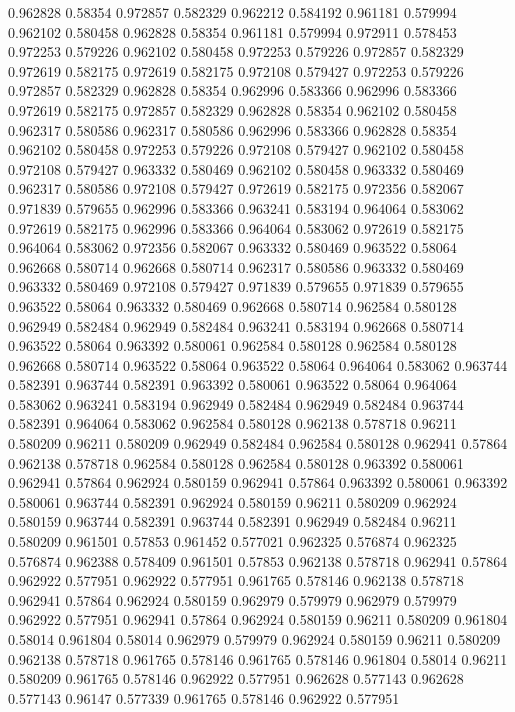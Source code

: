 0.962828 0.58354
0.972857 0.582329
0.962212 0.584192
0.961181 0.579994
0.962102 0.580458
0.962828 0.58354
0.961181 0.579994
0.972911 0.578453
0.972253 0.579226
0.962102 0.580458
0.972253 0.579226
0.972857 0.582329
0.972619 0.582175
0.972619 0.582175
0.972108 0.579427
0.972253 0.579226
0.972857 0.582329
0.962828 0.58354
0.962996 0.583366
0.962996 0.583366
0.972619 0.582175
0.972857 0.582329
0.962828 0.58354
0.962102 0.580458
0.962317 0.580586
0.962317 0.580586
0.962996 0.583366
0.962828 0.58354
0.962102 0.580458
0.972253 0.579226
0.972108 0.579427
0.962102 0.580458
0.972108 0.579427
0.963332 0.580469
0.962102 0.580458
0.963332 0.580469
0.962317 0.580586
0.972108 0.579427
0.972619 0.582175
0.972356 0.582067
0.971839 0.579655
0.962996 0.583366
0.963241 0.583194
0.964064 0.583062
0.972619 0.582175
0.962996 0.583366
0.964064 0.583062
0.972619 0.582175
0.964064 0.583062
0.972356 0.582067
0.963332 0.580469
0.963522 0.58064
0.962668 0.580714
0.962668 0.580714
0.962317 0.580586
0.963332 0.580469
0.963332 0.580469
0.972108 0.579427
0.971839 0.579655
0.971839 0.579655
0.963522 0.58064
0.963332 0.580469
0.962668 0.580714
0.962584 0.580128
0.962949 0.582484
0.962949 0.582484
0.963241 0.583194
0.962668 0.580714
0.963522 0.58064
0.963392 0.580061
0.962584 0.580128
0.962584 0.580128
0.962668 0.580714
0.963522 0.58064
0.963522 0.58064
0.964064 0.583062
0.963744 0.582391
0.963744 0.582391
0.963392 0.580061
0.963522 0.58064
0.964064 0.583062
0.963241 0.583194
0.962949 0.582484
0.962949 0.582484
0.963744 0.582391
0.964064 0.583062
0.962584 0.580128
0.962138 0.578718
0.96211 0.580209
0.96211 0.580209
0.962949 0.582484
0.962584 0.580128
0.962941 0.57864
0.962138 0.578718
0.962584 0.580128
0.962584 0.580128
0.963392 0.580061
0.962941 0.57864
0.962924 0.580159
0.962941 0.57864
0.963392 0.580061
0.963392 0.580061
0.963744 0.582391
0.962924 0.580159
0.96211 0.580209
0.962924 0.580159
0.963744 0.582391
0.963744 0.582391
0.962949 0.582484
0.96211 0.580209
0.961501 0.57853
0.961452 0.577021
0.962325 0.576874
0.962325 0.576874
0.962388 0.578409
0.961501 0.57853
0.962138 0.578718
0.962941 0.57864
0.962922 0.577951
0.962922 0.577951
0.961765 0.578146
0.962138 0.578718
0.962941 0.57864
0.962924 0.580159
0.962979 0.579979
0.962979 0.579979
0.962922 0.577951
0.962941 0.57864
0.962924 0.580159
0.96211 0.580209
0.961804 0.58014
0.961804 0.58014
0.962979 0.579979
0.962924 0.580159
0.96211 0.580209
0.962138 0.578718
0.961765 0.578146
0.961765 0.578146
0.961804 0.58014
0.96211 0.580209
0.961765 0.578146
0.962922 0.577951
0.962628 0.577143
0.962628 0.577143
0.96147 0.577339
0.961765 0.578146
0.962922 0.577951

